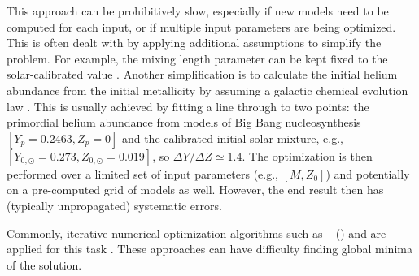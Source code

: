 \begin{description}
    \setlength{\itemindent}{0pt}
    \item[Speed.] This approach can be prohibitively slow, especially if new models need to be computed for each input, or if multiple input parameters are being optimized. 
    This is often dealt with by applying additional assumptions to simplify the problem. 
    For example, the mixing length parameter can be kept fixed to the solar-calibrated value \citep[e.g.,][]{2015MNRAS.452.2127S,2017ApJ...835..173S}. 
    Another simplification is to calculate the initial helium abundance from the initial metallicity by assuming a galactic chemical evolution law \citep[e.g.,][]{2015MNRAS.452.2127S, 2017ApJ...835..173S}. 
    This is usually achieved by fitting a line through to two points: the primordial helium abundance from models of Big Bang nucleosynthesis $[Y_p=0.2463,Z_p=0]$ \citep[e.g.,][]{2014JCAP...10..050C} and the calibrated initial solar mixture, e.g., ${[Y_{0,\odot}=0.273,Z_{0,\odot}=0.019]}$, so ${\Delta Y/\Delta Z \simeq 1.4}$. 
    The optimization is then performed over a limited set of input parameters (e.g., ${[M,Z_0]}$) and potentially on a pre-computed grid of models as well. 
    However, the end result then has (typically unpropagated) systematic errors. 
    
    \item[Local Minima.] Commonly, iterative numerical optimization algorithms such as
    \citeauthor{10.2307/43633451}--\citeauthor{10.2307/2098941} (\citeyear{10.2307/43633451,10.2307/2098941})
    and %
    are applied for this task \citep[e.g.,][]{2014A&A...569A..21L, 2015A&A...582A..25A}. 
    These approaches can have difficulty finding global minima of the solution. 
    

\end{description}
